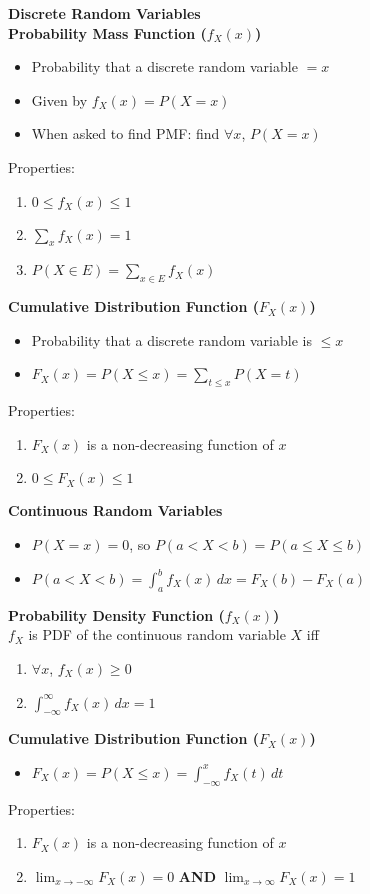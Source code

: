 \documentclass[a4paper, 12pt]{article}
\begin{document}
\begin{multicols*}{4}
{\small\textbf{Discrete Random Variables}} \\
\textbf{Probability Mass Function ($f_X(x)$)}
\begin{itemize}
    \item Probability that a discrete random variable $= x$
    \item Given by $f_X(x) = P(X = x)$
    \item When asked to find PMF: find $\forall x$, $P(X = x)$ 
\end{itemize}
\medskip
Properties:
\begin{enumerate}
    \item $0 \leq f_X(x) \leq 1$
    \item $\sum_{x} f_X(x) = 1$
    \item $P(X \in E) = \sum_{x \in E} f_X(x)$
\end{enumerate}
\textbf{Cumulative Distribution Function ($F_X(x)$)}
\begin{itemize}
    \item Probability that a discrete random variable is $\leq x$
    \item $F_X(x) = P(X \leq x) = \sum_{t \leq x} P(X = t)$
\end{itemize}
Properties:
\begin{enumerate}
    \item $F_X(x)$ is a non-decreasing function of $x$
    \item $0 \leq F_X(x) \leq 1$
\end{enumerate}

\medskip

{\small\textbf{Continuous Random Variables}}
\begin{itemize}
    \item $P(X = x) = 0$, so $P(a < X < b) = P(a \leq X \leq b)$
    \item $P(a < X < b) = \int_a^b f_X(x) \, dx = F_X(b) - F_X(a)$
\end{itemize}
\textbf{Probability Density Function ($f_X(x)$)} \\
$f_X$ is PDF of the continuous random variable $X$ iff
\begin{enumerate}
    \item $\forall x$, $f_X(x) \geq 0$
    \item $\int_{-\infty}^{\infty} f_X(x) \, dx = 1$
\end{enumerate}
\textbf{Cumulative Distribution Function ($F_X(x)$)}
\begin{itemize}
    \item $F_X(x) = P(X \leq x) = \int_{-\infty}^x f_X(t) \, dt$
\end{itemize}
Properties:
\begin{enumerate}
    \item $F_X(x)$ is a non-decreasing function of $x$
    \item $\lim_{x \rightarrow -\infty} F_X(x) = 0$ \textbf{AND} $\lim_{x \rightarrow \infty} F_X(x) = 1$
\end{enumerate}


\end{multicols*}
\end{document}
